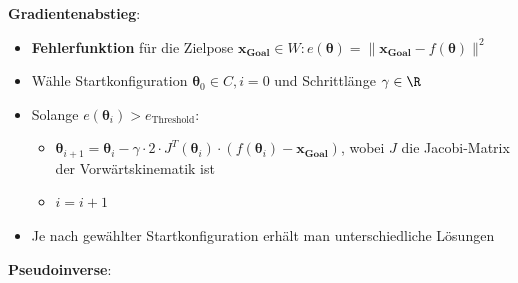 \textbf{Gradientenabstieg}:
\begin{itemize}
	\item \textbf{Fehlerfunktion} für die Zielpose $\mathbf{x_\text{Goal}}\in W\colon e(\boldsymbol{\theta})=\|\mathbf{x_\text{Goal}}-f(\boldsymbol{\theta})\|^2$
	\item Wähle Startkonfiguration $\boldsymbol{\theta}_0\in C, i=0$ und Schrittlänge $\gamma\in\R$
	\item Solange $e(\boldsymbol{\theta}_i)>e_\text{Threshold}$:
	\begin{itemize}
		\item $\boldsymbol{\theta}_{i+1}=\boldsymbol{\theta}_i-\gamma\cdot 2\cdot J^T(\boldsymbol{\theta}_i)\cdot(f(\boldsymbol{\theta}_i)-\mathbf{x_\text{Goal}})$, wobei $J$ die Jacobi-Matrix der Vorwärtskinematik ist
		\item $i=i+1$
	\end{itemize}
	\item Je nach gewählter Startkonfiguration erhält man unterschiedliche Lösungen
\end{itemize}
\bigskip
\textbf{Pseudoinverse}:
